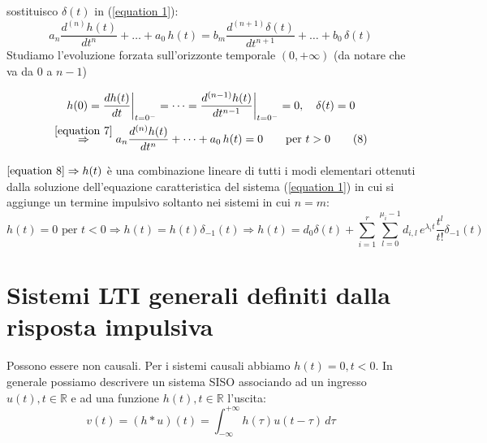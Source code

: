sostituisco $\delta (t)$ in (\ref{equation 1}):
\begin{equation}
	a_n \frac{d^{(n)} h(t)}{dt^n}+\dots+a_0\,h(t) = b_m \frac{d^{(n+1)} \delta(t)}{dt^{n+1}}+\dots+b_0\,\delta(t) %
	\tag{7}\label{equation 7}
\end{equation}
Studiamo l'evoluzione forzata sull'orizzonte temporale $(0,+\infty)$ (da notare che va da $0$ a $n-1$) %

\begin{multline} %
	h(0) = \frac{dh(t)}{dt}\bigg\vert_{t=0^-} = \dots %
	=\frac{d^{(n-1)}h(t)}{dt^{n-1}}\bigg\vert_{t=0^-}
	= 0,\quad
	\delta(t) = 0 \\
	\overset{\eqref{equation 7}}{\Rightarrow}a_n \frac{d^{(n)} h(t)}{dt^n}+\dots+a_0\,h(t) = 0 
	\qquad\text{per } t>0
	\tag{8}\label{equation 8}
\end{multline}
	
\begin{osservazione}
	$\eqref{equation 8} \Rightarrow h (t)$ è una combinazione lineare di tutti i modi elementari ottenuti dalla soluzione dell'equazione caratteristica del sistema (\ref{equation 1}) in cui si aggiunge un termine impulsivo soltanto nei sistemi in cui $n=m$:
	\begin{equation}
		h(t)=0 \text{ per } t<0 \Rightarrow h(t) = h(t)\delta_{-1} (t)
		\Rightarrow h(t)= d_0 \delta(t) + \sum_{i=1}^{r}\sum_{l=0}^{\mu_i-1}d_{i,l} \,e^{\lambda_it}\frac{t^l}{t!}\delta_{-1} (t)
		\tag{9}\label{equation 9}
	\end{equation}
\end{osservazione}



\section{Sistemi LTI generali definiti dalla risposta impulsiva}

Possono essere non causali.
Per i sistemi causali abbiamo $h(t) =0, t<0$.
In generale possiamo descrivere un sistema SISO associando ad un ingresso $u(t), t \in \mathbb{R}$ e ad una funzione $h(t), t \in \mathbb{R}$ l'uscita:
\begin{equation}
	v(t)=(h*u)(t) = \int_{-\infty}^{+\infty}h(\tau)u(t-\tau)\,d\tau
	\tag{10}\label{equation 10}
\end{equation}

